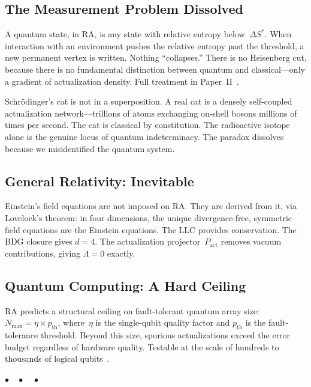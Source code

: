 \documentclass[12pt,a4paper]{article}
\begin{document}
\subsection{The Measurement Problem Dissolved}

A quantum state, in RA, is any state with relative entropy below~$\Delta S^*$. When interaction with an environment pushes the relative entropy past the threshold, a new permanent vertex is written. Nothing ``collapses.'' There is no Heisenberg cut, because there is no fundamental distinction between quantum and classical---only a gradient of actualization density. Full treatment in Paper~II~\cite{P2}.

Schr\"odinger's cat is not in a superposition. A real cat is a densely self-coupled actualization network---trillions of atoms exchanging on-shell bosons millions of times per second. The cat is classical by constitution. The radioactive isotope alone is the genuine locus of quantum indeterminacy. The paradox dissolves because we misidentified the quantum system.

\subsection{General Relativity: Inevitable}

Einstein's field equations are not imposed on RA. They are derived from it, via Lovelock's theorem: in four dimensions, the unique divergence-free, symmetric field equations are the Einstein equations. The LLC provides conservation. The BDG closure gives $d=4$. The actualization projector~$P_{\mathrm{act}}$ removes vacuum contributions, giving $\Lambda=0$ exactly.

\subsection{Quantum Computing: A Hard Ceiling}

RA predicts a structural ceiling on fault-tolerant quantum array size: $N_{\max} = \eta \times p_{\mathrm{th}}$, where~$\eta$ is the single-qubit quality factor and $p_{\mathrm{th}}$ is the fault-tolerance threshold. Beyond this size, spurious actualizations exceed the error budget regardless of hardware quality. Testable at the scale of hundreds to thousands of logical qubits~\cite{P2}.

\bigskip\begin{center}$\bullet\quad\bullet\quad\bullet$\end{center}\bigskip
\end{document}

